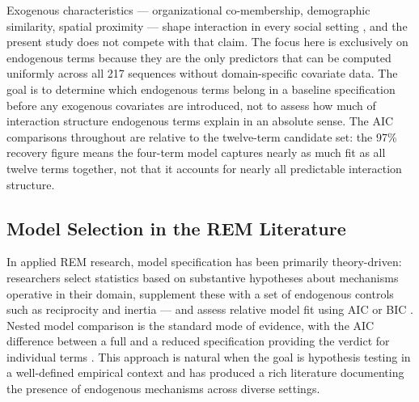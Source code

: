 \documentclass[11pt]{article}
\begin{document}
Exogenous characteristics --- organizational co-membership, demographic
similarity, spatial proximity --- shape interaction in every social setting
\citep{mcpherson2001birds}, and the present study does not compete with that
claim. The focus here is exclusively on endogenous terms because they are the
only predictors that can be computed uniformly across all 217 sequences without
domain-specific covariate data. The goal is to determine which endogenous terms
belong in a baseline specification before any exogenous covariates are introduced,
not to assess how much of interaction structure endogenous terms explain in an
absolute sense. The AIC comparisons throughout are relative to the twelve-term
candidate set: the 97\% recovery figure means the four-term model captures
nearly as much fit as all twelve terms together, not that it accounts for nearly
all predictable interaction structure.

\subsection{Model Selection in the REM Literature}

In applied REM research, model specification has been primarily
theory-driven: researchers select statistics based on substantive
hypotheses about mechanisms operative in their domain, supplement these
with a set of endogenous controls such as reciprocity and inertia
--- and assess relative model fit using AIC or BIC
\citep{butts_sm_2008,lerner2020reliability}. Nested model comparison is
the standard mode of evidence, with the AIC difference between a full and
a reduced specification providing the verdict for individual terms
\citep[see, e.g.,][]{kitts2017investigating,gravel2023rivalries,%
duxbury2021shining}. This approach is natural when the goal is hypothesis
testing in a well-defined empirical context and has produced a rich
literature documenting the presence of endogenous mechanisms across
diverse settings.
\end{document}
